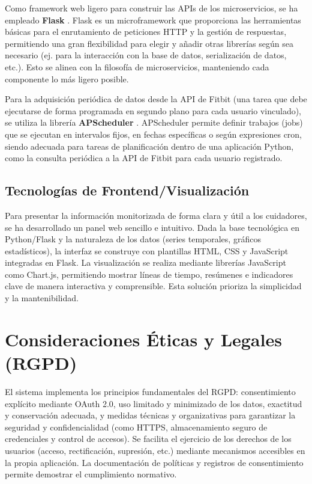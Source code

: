 Como framework web ligero para construir las APIs de los microservicios, se ha empleado \textbf{Flask} \cite{flask_docs}. Flask es un microframework que proporciona las herramientas básicas para el enrutamiento de peticiones HTTP y la gestión de respuestas, permitiendo una gran flexibilidad para elegir y añadir otras librerías según sea necesario (ej. para la interacción con la base de datos, serialización de datos, etc.). Esto se alinea con la filosofía de microservicios, manteniendo cada componente lo más ligero posible.

Para la adquisición periódica de datos desde la API de Fitbit\textsuperscript{\textregistered} (una tarea que debe ejecutarse de forma programada en segundo plano para cada usuario vinculado), se utiliza la librería \textbf{APScheduler} \cite{apscheduler_docs}. APScheduler permite definir trabajos (jobs) que se ejecutan en intervalos fijos, en fechas específicas o según expresiones cron, siendo adecuada para tareas de planificación dentro de una aplicación Python, como la consulta periódica a la API de Fitbit para cada usuario registrado.

\subsection{Tecnologías de Frontend/Visualización}
\label{subsec:ea_frontend_viz}

Para presentar la información monitorizada de forma clara y útil a los cuidadores, se ha desarrollado un panel web sencillo e intuitivo. Dada la base tecnológica en Python/Flask y la naturaleza de los datos (series temporales, gráficos estadísticos), la interfaz se construye con plantillas HTML, CSS y JavaScript integradas en Flask. La visualización se realiza mediante librerías JavaScript como Chart.js, permitiendo mostrar líneas de tiempo, resúmenes e indicadores clave de manera interactiva y comprensible. Esta solución prioriza la simplicidad y la mantenibilidad.

\section{Consideraciones Éticas y Legales (RGPD)}
\label{sec:ea_rgpd}

El sistema implementa los principios fundamentales del RGPD: consentimiento explícito mediante OAuth 2.0, uso limitado y minimizado de los datos, exactitud y conservación adecuada, y medidas técnicas y organizativas para garantizar la seguridad y confidencialidad (como HTTPS, almacenamiento seguro de credenciales y control de accesos). Se facilita el ejercicio de los derechos de los usuarios (acceso, rectificación, supresión, etc.) mediante mecanismos accesibles en la propia aplicación. La documentación de políticas y registros de consentimiento permite demostrar el cumplimiento normativo.